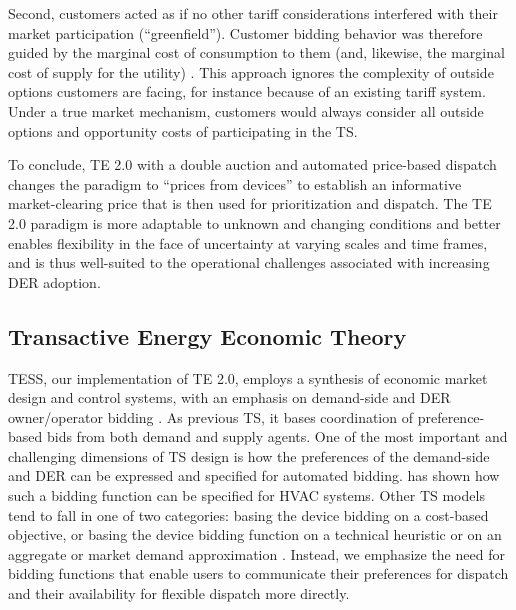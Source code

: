 Second, customers acted as if no other tariff considerations interfered with their market participation (``greenfield''). Customer bidding behavior was therefore guided by the marginal cost of consumption to them (and, likewise, the marginal cost of supply for the utility) \citep{chassin_kiesling_2008}.
This approach ignores the complexity of outside options customers are facing, for instance because of an existing tariff system. Under a true market mechanism, customers would always consider all outside options and opportunity costs of participating in the TS.

To conclude, TE 2.0 with a double auction and automated price-based dispatch changes the paradigm to ``prices from devices'' to establish an informative market-clearing price that is then used for prioritization and dispatch. The TE 2.0 paradigm is more adaptable to unknown and changing conditions and better enables flexibility in the face of uncertainty at varying scales and time frames, and is thus well-suited to the operational challenges associated with increasing DER adoption.

\subsection{Transactive Energy Economic Theory}\label{sec:teecon}

TESS, our implementation of TE 2.0, employs a synthesis of economic market design and control systems, with an emphasis on demand-side and DER owner/operator bidding \citep{chassin2017thesis}. 
As previous TS, it bases coordination of preference-based bids from both demand and supply agents. 
One of the most important and challenging dimensions of TS design is how the preferences of the demand-side and DER can be expressed and specified for automated bidding. 
\citet[Chapter IV]{Arlt2020} has shown how such a bidding function can be specified for HVAC systems.
Other TS models tend to fall in one of two categories: basing the device bidding on a cost-based objective, or basing the device bidding function on a technical heuristic or on an aggregate or market demand approximation \citep[Chapter IV]{Arlt2020}. Instead, we emphasize the need for bidding functions that enable users to communicate their preferences for dispatch and their availability for flexible dispatch more directly.

